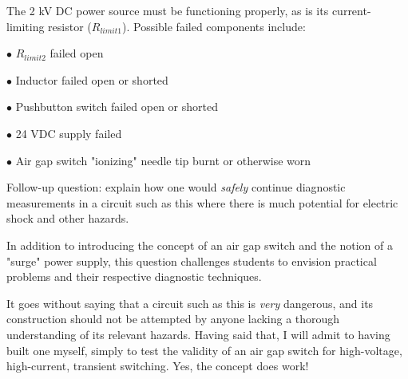 
The 2 kV DC power source must be functioning properly, as is its current-limiting resistor ($R_{limit1}$).  Possible failed components include:

\medskip
\item{$\bullet$} $R_{limit2}$ failed open
\item{$\bullet$} Inductor failed open or shorted
\item{$\bullet$} Pushbutton switch failed open or shorted
\item{$\bullet$} 24 VDC supply failed
\item{$\bullet$} Air gap switch "ionizing" needle tip burnt or otherwise worn
\medskip

\vskip 10pt

Follow-up question: explain how one would {\it safely} continue diagnostic measurements in a circuit such as this where there is much potential for electric shock and other hazards.







In addition to introducing the concept of an air gap switch and the notion of a "surge" power supply, this question challenges students to envision practical problems and their respective diagnostic techniques.

It goes without saying that a circuit such as this is {\it very} dangerous, and its construction should not be attempted by anyone lacking a thorough understanding of its relevant hazards.  Having said that, I will admit to having built one myself, simply to test the validity of an air gap switch for high-voltage, high-current, transient switching.  Yes, the concept does work!




